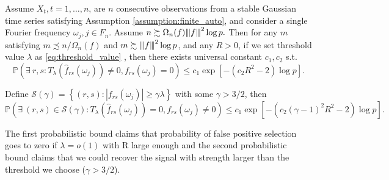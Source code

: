 \begin{prop}
\label{prop:consistency}
Assume ${X}_t, t=1,\ldots,n$, are $n$ consecutive observations from a stable Gaussian time series satisfying Assumption \ref{assumption:finite_auto}, and consider a single Fourier frequency $\omega_j, j\in F_n$. Assume $n \succsim  \Omega_n(f) {\left\vert\kern-0.25ex\left\vert\kern-0.25ex\left\vert f \right\vert\kern-0.25ex\right\vert\kern-0.25ex\right\vert}^2 \log p.$ Then for any $m $ satisfying $m \precsim n/ \Omega_n(f)$ and $m \succsim {\left\vert\kern-0.25ex\left\vert\kern-0.25ex\left\vert f \right\vert\kern-0.25ex\right\vert\kern-0.25ex\right\vert}^2\log p$, and any $R > 0$,
if we set threshold value $\lambda$ as \eqref{eq:threshold_value} , then there exists universal constant $c_1, c_2$  s.t.
\begin{equation}
\mathbb{P}\left(\exists ~r,s : T_\lambda(\hat{f}_{rs}(\omega_j)) \neq 0, f_{rs}(\omega_j)=0\right)\le  c_1\exp[-(c_2R^2-2) \log p]. \nonumber
\end{equation}

Define $\mathcal{S}(\gamma) = \left\{(r,s):|f_{rs}(\omega_j)|\ge \gamma \lambda \right\}$ with some $\gamma>3/2$, then
\begin{equation}
\mathbb{P}\left(\exists ~(r,s) \in \mathcal{S}(\gamma) : T_\lambda(\hat{f}_{rs}(\omega_j))=0, f_{rs}(\omega_j) \neq 0\right)\le  c_1\exp[-(c_2 (\gamma-1)^2R^2-2) \log p]. \nonumber
\end{equation}
\end{prop}



\begin{remark}
The first probabilistic bound claims that probability of false positive selection goes to zero if $\lambda = o(1)$ with R large enough and the second probabilistic bound claims that we could recover the signal with strength larger than the threshold we choose ($\gamma>3/2$). 
\end{remark}



